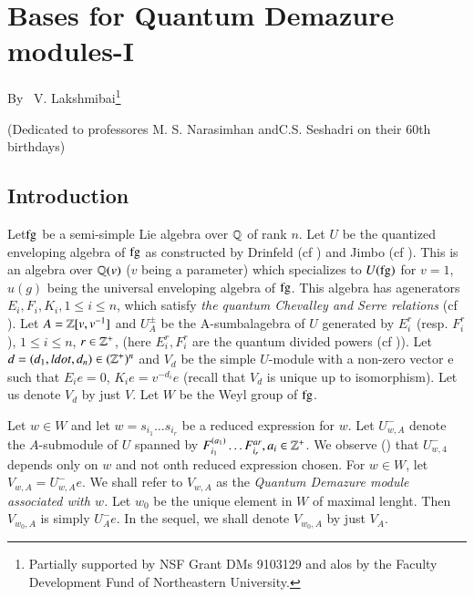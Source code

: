 \chapter{Bases for Quantum Demazure modules-I}\label{chap9}


\begin{center}
By~ V. Lakshmibai\footnote{Partially supported by NSF Grant DMs 9103129 and alos by the Faculty Development Fund of Northeastern University.}

\medskip
(Dedicated to professores M. S. Narasimhan and\break C.S. Seshadri on their 60th birthdays)
\end{center}


\section{Introduction}\label{chap9-sec-1}
Let\pageoriginale $\operatorname{fg}$ be a semi-simple Lie algebra over $\mathbb{Q}$ of rank $n$. Let $U$ be the quantized enveloping algebra of $\operatorname{fg}$ as constructed by Drinfeld (cf \cite{chap9-keyD}) and Jimbo (cf \cite{chap9-keyJ}). This is an algebra over $\mathbb{Q}(v)$ ($v$ being a parameter)  which specializes to $U(\operatorname{fg})$ for $v=1$, $u(g)$ being the universal enveloping algebra of $\operatorname{fg}$. This algebra has agenerators $E_{i}, F_{i}, K_{i}, 1\leq i \leq n$, which satisfy \textit{the quantum Chevalley and Serre relations} (cf \cite{chap9-keyL1}). Let $A= \mathbb{Z}[v, v^{-1}] $ and $U_{A}^{\pm}$ be the A-sumbalagebra of $U$ generated by $E_{i}^{r}$ (resp. $F_{i}^{r}$), $1\leq i \leq n$, $r \in \mathbb{Z}^{+}$, (here $E_{i}^{r}, F_{i}^{r}$ are the quantum divided powers (cf \cite{chap9-keyJ})). Let $d=(d_{1}, ldot, d_{n}) \in (\mathbb{Z}^{+})^{n}$ and $V_{d}$ be the simple $U$-module with a non-zero vector e such that $E_{i}e=0$, $K_{i}e =v^{-d_{i}}e$ (recall that $V_{d}$ is unique up to isomorphism). Let us denote $V_{d}$ by just $V$. Let $W$ be the Weyl group of $\operatorname{fg}$.

Let $w \in W$ and let $w=s_{i_{1}}\ldots s_{i_{r}}$ be a reduced expression for $w$. Let $U_{w,A}^{-}$ denote the $A$-submodule of $U$ spanned by $F_{i_{1}}^{(a_{1})}\ldots F_{i_{r}}^{ar}, a_{i}\in \mathbb{Z}^{+}$. We observe (\cite{chap9-keyL4}) that $U_{w,4}^{-}$ depends only on $w$ and not onth reduced expression chosen. For $w\in W$, let $V_{w,A}=U_{w,A}^{-}e$. We shall refer to $V_{w, A}$ as the \textit{Quantum Demazure module associated with $w$.} Let $w_{0}$ be the unique element in $W$ of maximal lenght. Then $V_{w_{0},A}$ is simply $U_{A}^{-}e$. In the sequel, we shall denote $V_{w_{0}, A}$ by just $V_{A}$.

